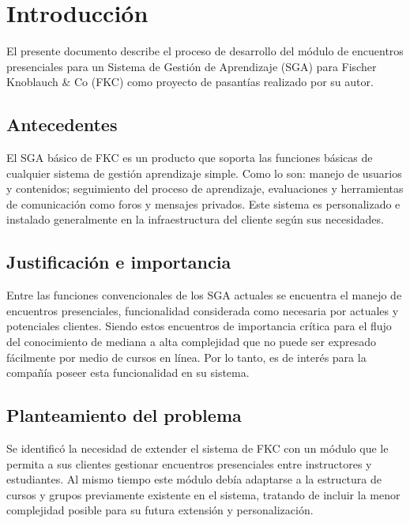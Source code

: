 ﻿\chapter*{Introducción}
\thispagestyle{empty} %
 
El presente documento describe el proceso de desarrollo del módulo de encuentros presenciales para un Sistema de Gestión de Aprendizaje (SGA) para Fischer Knoblauch \& Co (FKC) como proyecto de pasantías realizado por su autor.

\section*{Antecedentes}
El SGA básico de FKC es un producto que soporta las funciones básicas de cualquier sistema de gestión aprendizaje simple. Como lo son: manejo de usuarios y contenidos; seguimiento del proceso de aprendizaje, evaluaciones y herramientas de comunicación como foros y mensajes privados. Este sistema es personalizado e instalado generalmente en la infraestructura del cliente según sus necesidades.

\section*{Justificación e importancia}
Entre las funciones convencionales de los SGA actuales se encuentra el manejo de encuentros presenciales, funcionalidad considerada como necesaria por actuales y potenciales clientes. Siendo estos encuentros de importancia crítica para el flujo del conocimiento de mediana a alta complejidad que no puede ser expresado fácilmente por medio de cursos en línea. Por lo tanto, es de interés para la compañía poseer esta funcionalidad en su sistema.


\section*{Planteamiento del problema}
Se identificó la necesidad de extender el sistema de FKC con un módulo que le permita a sus clientes gestionar encuentros presenciales entre instructores y estudiantes. Al mismo tiempo este módulo debía adaptarse a la estructura de cursos y grupos previamente existente en el sistema, tratando de incluir la menor complejidad posible para su futura extensión y personalización.

